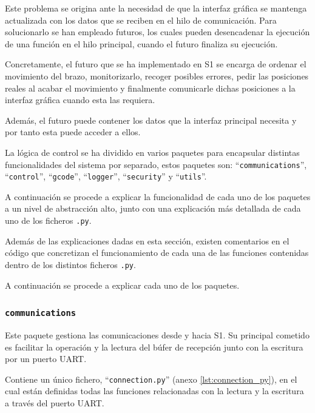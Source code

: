 Este problema se origina ante la necesidad de que la interfaz gráfica se mantenga actualizada con los datos que se reciben en el hilo de comunicación. Para solucionarlo se han empleado futuros, los cuales pueden desencadenar la ejecución de una función en el hilo principal, cuando el futuro finaliza su ejecución.

Concretamente, el futuro que se ha implementado en \ac{S1} se encarga de ordenar el movimiento del brazo, monitorizarlo, recoger posibles errores, pedir las posiciones reales al acabar el movimiento y finalmente comunicarle dichas posiciones a la interfaz gráfica cuando esta las requiera.

Además, el futuro puede contener los datos que la interfaz principal necesita y por tanto esta puede acceder a ellos.


La lógica de control se ha dividido en varios paquetes para encapsular distintas funcionalidades del sistema por separado, estos paquetes son: ``\texttt{communications}'', ``\texttt{control}'', ``\texttt{gcode}'', ``\texttt{logger}'', ``\texttt{security}'' y ``\texttt{utils}''.

A continuación se procede a explicar la funcionalidad de cada uno de los paquetes a un nivel de abstracción alto, junto con una explicación más detallada de cada uno de los ficheros \texttt{.py}.

Además de las explicaciones dadas en esta sección, existen comentarios en el código que concretizan el funcionamiento de cada una de las funciones contenidas dentro de los distintos ficheros \texttt{.py}.

A continuación se procede a explicar cada uno de los paquetes.

\subsubsection{\texttt{communications}}
Este paquete gestiona las comunicaciones desde y hacia \ac{S1}. Su principal cometido es facilitar la operación y la lectura del búfer de recepción junto con la escritura por un puerto UART.

Contiene un único fichero, ``\texttt{connection.py}'' (anexo \ref{lst:connection_py}), en el cual están definidas todas las funciones relacionadas con la lectura y la escritura a través del puerto UART.

